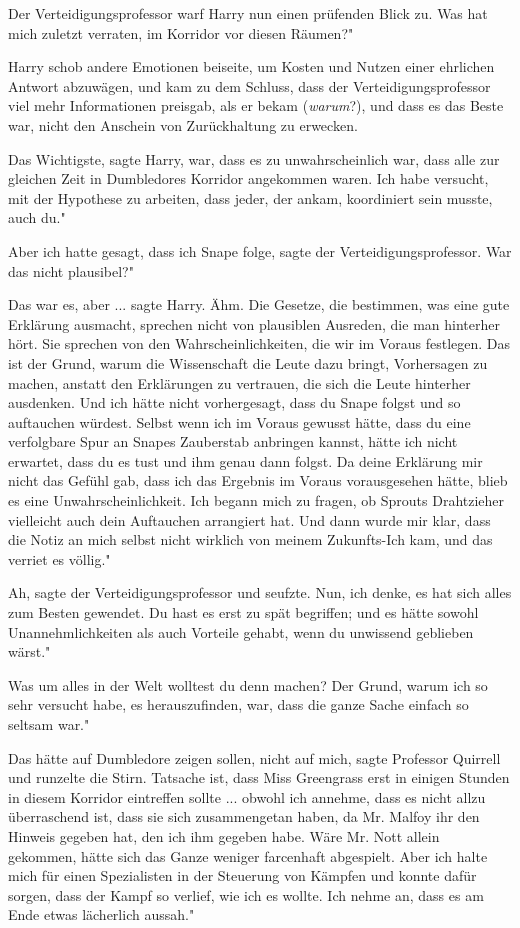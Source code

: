 Der Verteidigungsprofessor warf Harry nun einen prüfenden Blick zu. \glqq{}Was
hat mich zuletzt verraten, im Korridor vor diesen Räumen?"

Harry schob andere Emotionen beiseite, um Kosten und Nutzen einer ehrlichen
Antwort abzuwägen, und kam zu dem Schluss, dass der Verteidigungsprofessor viel
mehr Informationen preisgab, als er bekam (\emph{warum}?), und dass es das Beste
war, nicht den Anschein von Zurückhaltung zu erwecken.

\glqq{}Das Wichtigste\grqq{}, sagte Harry, \glqq{}war, dass es zu unwahrscheinlich
war, dass alle zur gleichen Zeit in Dumbledores Korridor angekommen waren. Ich
habe versucht, mit der Hypothese zu arbeiten, dass jeder, der ankam, koordiniert
sein musste, auch du."

\glqq{}Aber ich hatte gesagt, dass ich Snape folge\grqq{}, sagte der
Verteidigungsprofessor. \glqq{}War das nicht plausibel?"

\glqq{}Das war es, aber ...\grqq{} sagte Harry. \glqq{}Ähm. Die Gesetze, die
bestimmen, was eine gute Erklärung ausmacht, sprechen nicht von plausiblen
Ausreden, die man hinterher hört. Sie sprechen von den Wahrscheinlichkeiten, die
wir im Voraus festlegen. Das ist der Grund, warum die Wissenschaft die Leute
dazu bringt, Vorhersagen zu machen, anstatt den Erklärungen zu vertrauen, die
sich die Leute hinterher ausdenken. Und ich hätte nicht vorhergesagt, dass du
Snape folgst und so auftauchen würdest. Selbst wenn ich im Voraus gewusst hätte,
dass du eine verfolgbare Spur an Snapes Zauberstab anbringen kannst, hätte ich
nicht erwartet, dass du es tust und ihm genau dann folgst. Da deine Erklärung
mir nicht das Gefühl gab, dass ich das Ergebnis im Voraus vorausgesehen hätte,
blieb es eine Unwahrscheinlichkeit. Ich begann mich zu fragen, ob Sprouts
Drahtzieher vielleicht auch dein Auftauchen arrangiert hat. Und dann wurde mir
klar, dass die Notiz an mich selbst nicht wirklich von meinem Zukunfts-Ich kam,
und das verriet es völlig."

\glqq{}Ah\grqq{}, sagte der Verteidigungsprofessor und seufzte. \glqq{}Nun, ich
denke, es hat sich alles zum Besten gewendet. Du hast es erst zu spät begriffen;
und es hätte sowohl Unannehmlichkeiten als auch Vorteile gehabt, wenn du
unwissend geblieben wärst."

\glqq{}Was um alles in der Welt wolltest du denn machen? Der Grund, warum ich so
sehr versucht habe, es herauszufinden, war, dass die ganze Sache einfach so
seltsam war."

\glqq{}Das hätte auf Dumbledore zeigen sollen, nicht auf mich\grqq{}, sagte
Professor Quirrell und runzelte die Stirn. \glqq{}Tatsache ist, dass Miss
Greengrass erst in einigen Stunden in diesem Korridor eintreffen sollte ...
obwohl ich annehme, dass es nicht allzu überraschend ist, dass sie sich
zusammengetan haben, da Mr. Malfoy ihr den Hinweis gegeben hat, den ich ihm
gegeben habe. Wäre Mr. Nott allein gekommen, hätte sich das Ganze weniger
farcenhaft abgespielt. Aber ich halte mich für einen Spezialisten in der
Steuerung von Kämpfen und konnte dafür sorgen, dass der Kampf so verlief, wie
ich es wollte. Ich nehme an, dass es am Ende etwas lächerlich aussah."

